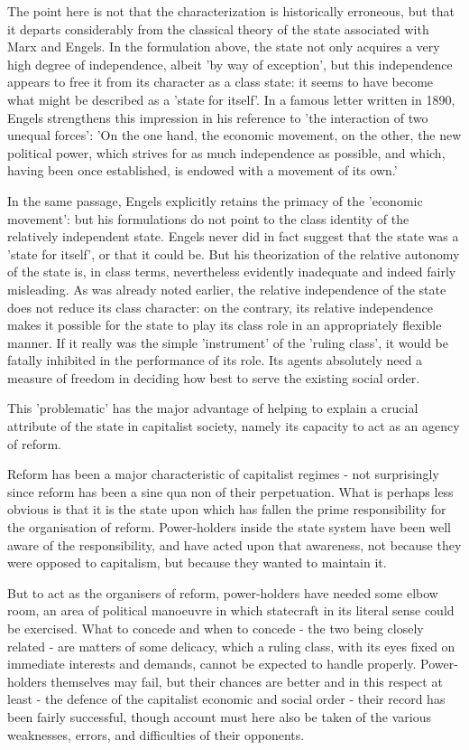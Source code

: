 The point here is not that the characterization is historically  erroneous, but that it departs considerably from the classical theory of the state associated with Marx and Engels. In the formulation above, the state not only acquires a very high degree of independence, albeit 'by way of exception', but this independence appears to free it from its character as a class state: it seems to have become what might be described as a 'state for itself'. In a famous letter written in 1890, Engels strengthens this impression in his reference to 'the interaction of two unequal forces': 'On the one hand, the economic movement, on the other, the new political power, which strives for as much independence as possible, and which, having been once established, is endowed with a movement of its own.'

In the same passage, Engels explicitly retains the primacy of the 'economic movement': but his formulations do not point to the class identity of the relatively independent state. Engels never did in fact suggest that the state was a 'state for itself', or that it could be. But his theorization of the relative autonomy of the state is, in class terms, nevertheless evidently inadequate and indeed fairly misleading. As was already noted earlier, the relative independence of the state does not reduce its class character: on the contrary, its relative independence makes it possible for the state to play its class role in an appropriately flexible manner. If it really was the simple 'instrument' of the 'ruling class', it would be fatally inhibited in the performance of its role. Its agents absolutely need a measure of freedom in deciding how best to serve the existing social order.

This 'problematic' has the major advantage of helping to explain a crucial attribute of the state in capitalist society, namely its capacity to act as an agency of reform.

Reform has been a major characteristic of capitalist regimes - not surprisingly since reform has been a sine qua non of their perpetuation. What is perhaps less obvious is that it is the state upon which has fallen the prime responsibility for the organisation of reform. Power-holders inside the state system have been well aware of the responsibility, and have acted upon that awareness, not because they were opposed to capitalism, but because they wanted to maintain it.

But to act as the organisers of reform, power-holders have needed some elbow room, an area of political manoeuvre in which statecraft in its literal sense could be exercised. What to concede and when to concede - the two being closely related - are matters of some delicacy, which a ruling class, with its eyes fixed on immediate interests and demands, cannot be expected to handle properly. Power\hyp{}holders themselves may fail, but their chances are better and in this respect at least - the defence of the capitalist economic and social order - their record has been fairly successful, though account must here also be taken of the various weaknesses, errors, and difficulties of their opponents.

